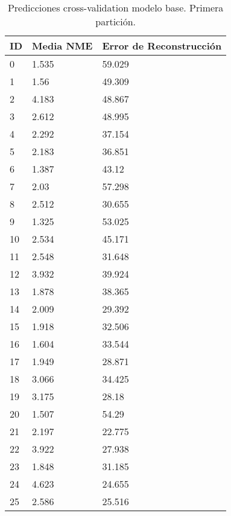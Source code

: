 \begin{table}[!ht]
    \centering
    \caption{Predicciones cross-validation modelo base. Primera partición.}
    \begin{tabular}{|l|l|l|}
    \hline
        \cellcolor{gray!25}\textbf{ID} & \cellcolor{gray!25}\textbf{Media NME} & \cellcolor{gray!25}\textbf{Error de Reconstrucción} \\ \hline
        0 & 1.535 & 59.029 \\ \hline
        1 & 1.56 & 49.309 \\ \hline
        2 & 4.183 & 48.867 \\ \hline
        3 & 2.612 & 48.995 \\ \hline
        4 & 2.292 & 37.154 \\ \hline
        5 & 2.183 & 36.851 \\ \hline
        6 & 1.387 & 43.12 \\ \hline
        7 & 2.03 & 57.298 \\ \hline
        8 & 2.512 & 30.655 \\ \hline
        9 & 1.325 & 53.025 \\ \hline
        10 & 2.534 & 45.171 \\ \hline
        11 & 2.548 & 31.648 \\ \hline
        12 & 3.932 & 39.924 \\ \hline
        13 & 1.878 & 38.365 \\ \hline
        14 & 2.009 & 29.392 \\ \hline
        15 & 1.918 & 32.506 \\ \hline
        16 & 1.604 & 33.544 \\ \hline
        17 & 1.949 & 28.871 \\ \hline
        18 & 3.066 & 34.425 \\ \hline
        19 & 3.175 & 28.18 \\ \hline
        20 & 1.507 & 54.29 \\ \hline
        21 & 2.197 & 22.775 \\ \hline
        22 & 3.922 & 27.938 \\ \hline
        23 & 1.848 & 31.185 \\ \hline
        24 & 4.623 & 24.655 \\ \hline
        25 & 2.586 & 25.516 \\ \hline
    \end{tabular}
\end{table}

